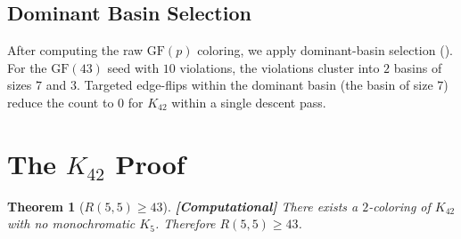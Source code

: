 \documentclass[12pt,a4paper]{article}
\newcommand{\computational}[1]{\textcolor{computational}{\textbf{[Computational]}} #1}
\newtheorem{theorem}{Theorem}[section]
\theoremstyle{definition}
\theoremstyle{remark}
\newcommand{\GF}[1]{\mathrm{GF}(#1)}
\newcommand{\Kn}[1]{K_{#1}}
\newcommand{\Rnum}[2]{R(#1,#2)}
\begin{document}
\subsection{Dominant Basin Selection}

After computing the raw $\GF{p}$ coloring, we apply dominant-basin selection ().  For the $\GF{43}$ seed with $10$ violations, the violations cluster into $2$ basins of sizes $7$ and $3$.  Targeted edge-flips within the dominant basin (the basin of size $7$) reduce the count to $0$ for $\Kn{42}$ within a single descent pass.


\section{The $\Kn{42}$ Proof}\label{sec:k42}

\begin{theorem}[$R(5,5) \ge 43$]\label{thm:main}
\computational{There exists a $2$-coloring of $\Kn{42}$ with no monochromatic $K_5$.  Therefore $\Rnum{5}{5} \ge 43$.}
\end{theorem}
\end{document}
